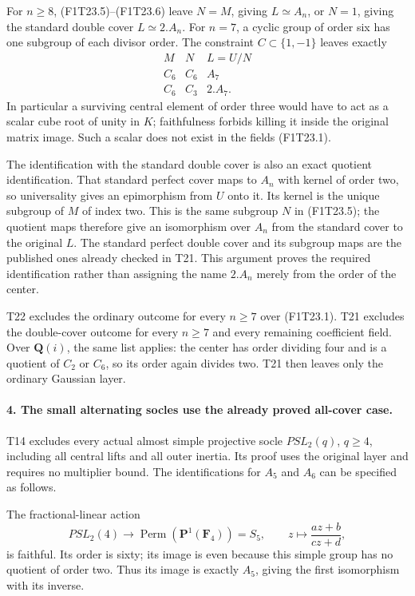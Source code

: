 For \(n\ge8\), (F1T23.5)--(F1T23.6) leave
\(N=M\), giving \(L\simeq A_n\), or \(N=1\),
giving the standard double cover \(L\simeq2.A_n\).
For \(n=7\), a cyclic group of order six has one
subgroup of each divisor order. The constraint
\(C\subset\{1,-1\}\) leaves exactly
\[
 \begin{array}{c|c|c}
 M&N&L=U/N\\\hline
 C_6&C_6&A_7\\
 C_6&C_3&2.A_7.
 \end{array}
 \tag{F1T23.7}
\]
In particular a surviving central element of order
three would have to act as a scalar cube root of
unity in \(K\); faithfulness forbids killing it
inside the original matrix image. Such a scalar
does not exist in the fields (F1T23.1).

The identification with the standard double cover is
also an exact quotient identification. That standard
perfect cover maps to \(A_n\) with kernel of order
two, so universality gives an epimorphism from \(U\)
onto it. Its kernel is the unique subgroup of \(M\)
of index two. This is the same subgroup \(N\) in
(F1T23.5); the quotient maps therefore give an
isomorphism over \(A_n\) from the standard cover
to the original \(L\). The standard perfect double
cover and its subgroup maps are the published ones
already checked in T21. This argument proves the
required identification rather than assigning the
name \(2.A_n\) merely from the order of the center.

T22 excludes the ordinary outcome for every \(n\ge7\)
over (F1T23.1). T21 excludes the double-cover outcome
for every \(n\ge7\) and every remaining coefficient
field. Over \(\mathbf Q(i)\), the same list applies:
the center has order dividing four and is a quotient
of \(C_2\) or \(C_6\), so its order again divides
two. T21 then leaves only the ordinary Gaussian layer.

\paragraph{4. The small alternating socles use the already proved all-cover case.}
T14 excludes every actual almost simple projective
socle \(PSL_2(q)\), \(q\ge4\), including all
central lifts and all outer inertia. Its proof uses
the original layer and requires no multiplier bound.
The identifications for \(A_5\) and \(A_6\) can
be specified as follows.

The fractional-linear action
\[
 PSL_2(4)\longrightarrow\operatorname{Perm}
             (\mathbf P^1(\mathbf F_4))=S_5,
 \qquad z\longmapsto\frac{az+b}{cz+d},
 \tag{F1T23.8}
\]
is faithful. Its order is sixty; its image is even
because this simple group has no quotient of order
two. Thus its image is exactly \(A_5\), giving
the first isomorphism with its inverse.

